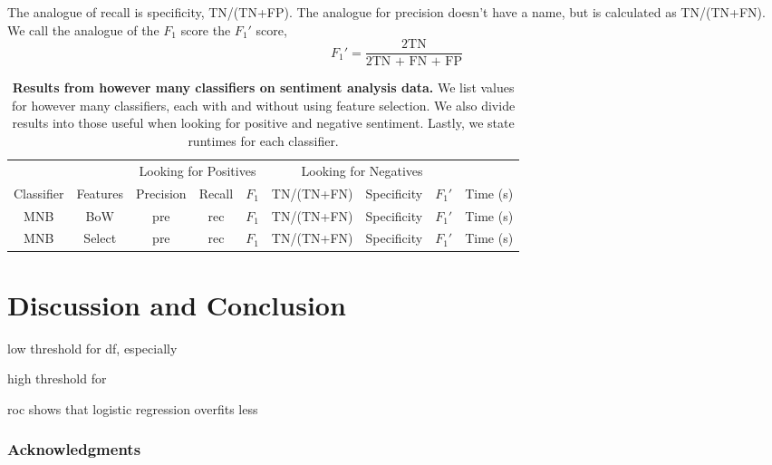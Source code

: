 \documentclass{article} %
\begin{document}
	The analogue of recall is specificity, TN/(TN+FP). The analogue for precision doesn't have a name, but is calculated as TN/(TN+FN). We call the analogue of the $F_1$ score the $F_1'$ score,
	\begin{equation}
	F_1' = \frac{\mbox{2TN}}{\mbox{2TN + FN + FP}}
	\end{equation}
	
	\begin{table}
		\centering
		\begin{tabular}[]{@{}|c|c|c|c|c|c|c|c|c|@{}}
			\hline
			\multicolumn{2}{|c|}{} & \multicolumn{3}{c}{Looking for Positives} & \multicolumn{3}{c}{Looking for Negatives} &\\
			\cline{3-9}
			Classifier& Features& Precision& Recall& $F_1$& TN/(TN+FN)& Specificity & $F_1'$ & Time (s)\\
			\hline
			\hline
			MNB & BoW  & pre & rec & $F_1$& TN/(TN+FN)& Specificity & $F_1'$ & Time (s)\\
			MNB & Select & pre & rec & $F_1$& TN/(TN+FN)& Specificity & $F_1'$ & Time (s)\\
			\hline
		\end{tabular}
		\caption{{\bf Results from however many classifiers on sentiment analysis data.} We list values for however many classifiers, each with and without using feature selection. We also divide results into those useful when looking for positive and negative sentiment. Lastly, we state runtimes for each classifier.}
		\label{tab:results}
	\end{table}
	
	\section{Discussion and Conclusion}
	
	low threshold for df, especially 
	
	high threshold for 
	
	roc shows that logistic regression overfits less
	
	\subsubsection*{Acknowledgments}
	
	
	
	
	
\end{document}
